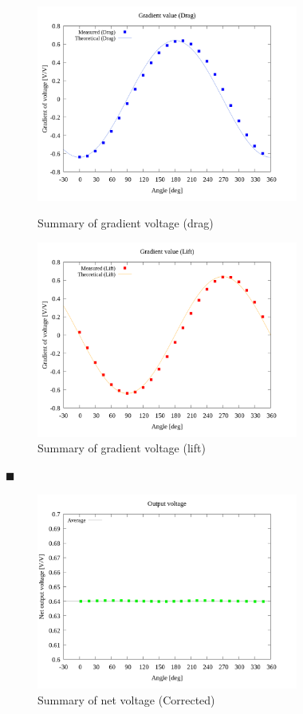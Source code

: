 \documentclass[twocolumn,a4j]{jsarticle}
\begin{document}
\begin{figure}[htbp]
    \footnotesize
    \begin{center}
        \includegraphics[width=86mm]{../graphes/simulation_1/21/21-1_summary_drag.png}
        \caption{Summary of gradient voltage (drag)}
        \includegraphics[width=86mm]{../graphes/simulation_1/21/21-1_summary_lift.png}
        \caption{Summary of gradient voltage (lift)}
    \end{center}
\end{figure}

$\blacksquare$ 

\begin{figure}[htbp]
    \footnotesize
    \begin{center}
        \includegraphics[width=86mm]{../graphes/simulation_1/09/09_summary-outputvoltage-net.png}
        \caption{Summary of net voltage (Corrected)}
    \end{center}
\end{figure}
\end{document}
